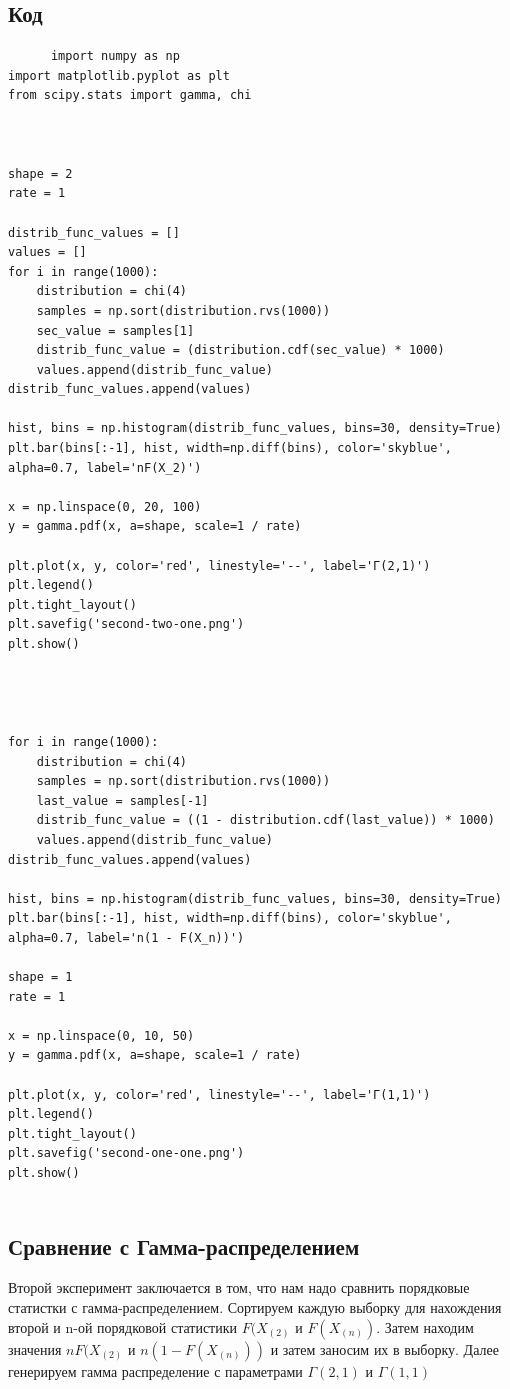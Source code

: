 \documentclass{article}
\begin{document}
\subsection{Код}
\begin{verbatim}
      import numpy as np
import matplotlib.pyplot as plt
from scipy.stats import gamma, chi



shape = 2
rate = 1

distrib_func_values = []
values = []
for i in range(1000):
    distribution = chi(4)
    samples = np.sort(distribution.rvs(1000))
    sec_value = samples[1]
    distrib_func_value = (distribution.cdf(sec_value) * 1000)
    values.append(distrib_func_value)
distrib_func_values.append(values)

hist, bins = np.histogram(distrib_func_values, bins=30, density=True)
plt.bar(bins[:-1], hist, width=np.diff(bins), color='skyblue', alpha=0.7, label='nF(X_2)')

x = np.linspace(0, 20, 100)
y = gamma.pdf(x, a=shape, scale=1 / rate)

plt.plot(x, y, color='red', linestyle='--', label='Г(2,1)')
plt.legend()
plt.tight_layout()
plt.savefig('second-two-one.png')
plt.show()




for i in range(1000):
    distribution = chi(4)
    samples = np.sort(distribution.rvs(1000))
    last_value = samples[-1]
    distrib_func_value = ((1 - distribution.cdf(last_value)) * 1000)
    values.append(distrib_func_value)
distrib_func_values.append(values)

hist, bins = np.histogram(distrib_func_values, bins=30, density=True)
plt.bar(bins[:-1], hist, width=np.diff(bins), color='skyblue', alpha=0.7, label='n(1 - F(X_n))')

shape = 1
rate = 1

x = np.linspace(0, 10, 50)
y = gamma.pdf(x, a=shape, scale=1 / rate)

plt.plot(x, y, color='red', linestyle='--', label='Г(1,1)')
plt.legend()
plt.tight_layout()
plt.savefig('second-one-one.png')
plt.show()


\end{verbatim}


\subsection{Сравнение с Гамма-распределением}
Второй эксперимент заключается в том, что нам надо сравнить порядковые статистки с гамма-распределением.
Сортируем каждую выборку для нахождения второй и n-ой порядковой статистики $F(X_{(2)}$ и $F(X_{(n)})$.
Затем находим значения $nF(X_{(2)}$ и $n(1 - F(X_{(n)}))$ и затем заносим их в выборку.
Далее генерируем гамма распределение с параметрами $\Gamma(2, 1)$ и $\Gamma(1, 1)$
\end{document}

